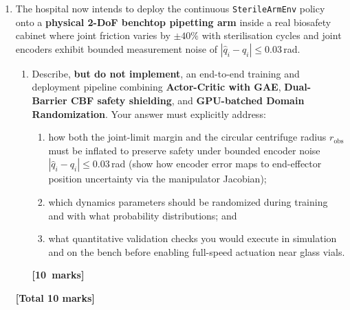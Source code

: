 \documentclass[11pt,a4paper]{article}
\newcommand{\qmarks}[1]{\par\nopagebreak\noindent\hfill\mbox{\textbf{[#1 marks]}}}
\newcommand{\qtotal}[1]{\par\smallskip\noindent\hfill\textbf{[Total #1 marks]}\par\medskip}
\begin{document}
\begin{enumerate}[label=\textbf{\arabic*.}, leftmargin=1.5em, itemsep=0.6em]
\begin{enumerate}[label=\textbf{\alph*.}, leftmargin=1.6em, itemsep=0.45em]
    \item Complete \texttt{sample\_trolley\_randomization} in \texttt{q4\_payload\_sim.py} to randomize all three physical parameters across batched worlds: (i)~\texttt{mast\_damping} $\in [10^{-3}, 1.0]$ (supporting both \textbf{linear-uniform} and \textbf{log-uniform} modes), (ii)~\texttt{floor\_friction} $\in [0.2, 1.5]$, and (iii)~\texttt{payload\_mass} $\in [0.2, 1.5]\,$kg. Explain how each parameter is written into the batched MuJoCo Warp model. \qmarks{6}

    \item Run $N = 32$ parallel open-loop rollouts from identical initial mast tilt ($\theta_0 = +0.25\,$rad, 500 steps) comparing narrow vs.\ wide randomization ranges and linear vs.\ log-uniform damping. Quantify the terminal tilt spread $\sigma_{\mathrm{final}}$ and justify mathematically why dissipative parameters such as hinge damping require log-uniform sampling ($p(d) \propto 1/d$). \qmarks{5}
\end{enumerate}
\qtotal{20}

\item The hospital now intends to deploy the continuous \texttt{SterileArmEnv} policy onto a \textbf{physical 2-DoF benchtop pipetting arm} inside a real biosafety cabinet where joint friction varies by $\pm 40\%$ with sterilisation cycles and joint encoders exhibit bounded measurement noise of $|\hat{q}_i - q_i| \le 0.03\,$rad.
\begin{enumerate}[label=\textbf{\alph*.}, leftmargin=1.6em, itemsep=0.45em]
    \item Describe, \textbf{but do not implement}, an end-to-end training and deployment pipeline combining \textbf{Actor-Critic with GAE}, \textbf{Dual-Barrier CBF safety shielding}, and \textbf{GPU-batched Domain Randomization}. Your answer must explicitly address:
    \begin{enumerate}[label=(\roman*), leftmargin=1.8em, itemsep=0.15em]
        \item how both the joint-limit margin and the circular centrifuge radius $r_{\mathrm{obs}}$ must be inflated to preserve safety under bounded encoder noise $|\hat{q}_i - q_i| \le 0.03\,$rad (show how encoder error maps to end-effector position uncertainty via the manipulator Jacobian);
        \item which dynamics parameters should be randomized during training and with what probability distributions; and
        \item what quantitative validation checks you would execute in simulation and on the bench before enabling full-speed actuation near glass vials.
    \end{enumerate} \qmarks{10}
\end{enumerate}
\qtotal{10}

\end{enumerate}
\end{document}
